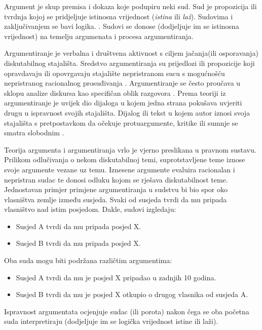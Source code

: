 Argument je skup premisa i dokaza koje podupiru neki sud. Sud je propozicija ili tvrdnja  kojoj se pridjeljuje istinosna vrijednost (\emph{istina} ili \emph{laž}). Sudovima i zaključivanjem se bavi logika. \citep{vukovic2007matematicka}. Sudovi se donose (dodjeljuje im se istinosna vrijednost) na temelju argumenata i procesa argumentiranja.  

Argumentiranje je verbalna i društvena aktivnost s ciljem jačanja(ili osporavanja) diskutabilnog stajališta. Sredstvo argumentiranja su prijedlozi ili propozicije  koji opravdavaju ili opovrgavaju stajalište nepristranom sucu s mogućnošću nepristranog racionalnog prosuđivanja \citep{rahwan2006representing}. Argumentiranje se često proučava u sklopu analize diskursa kao specifičan oblik razgovora \citep{palau2009argumentation}. Prema teoriji iz \citep{van2003systematic} argumentiranje je uvijek dio dijaloga u kojem jedna strana pokušava uvjeriti drugu u ispravnost svojih stajališta. Dijalog ili tekst u kojem autor iznosi svoja stajališta s pretpostavkom da očekuje protuargumente, kritike ili sumnje se smatra slobodnim . 

Teorija argumenta i argumentiranja vrlo je vjerno preslikana u pravnom sustavu. Prilikom odlučivanja o nekom diskutabilnoj temi, suprotstavljene teme iznose svoje argumente vezane uz temu. Iznesene argumente evaluira racionalan i nepristran sudac te donosi odluku kojom se rješava diskutabilnost teme.
Jednostavan primjer primjene argumentiranja u sudstvu bi bio spor oko vlasništva zemlje između susjeda. Svaki od susjeda tvrdi da mu pripada vlasništvo nad istim posjedom. Dakle, sudovi izgledaju:

\begin{itemize}
\item Susjed A tvrdi da mu pripada posjed X.
\item Susjed B tvrdi da mu pripada posjed X.
\end{itemize}

Oba suda mogu biti podržana različtim argumentima:

\begin{itemize}
\item Susjed A tvrdi da mu je posjed X pripadao u zadnjih 10 godina.
\item Susjed B tvrdi da mu je posjed X otkupio o drugog vlasnika od susjeda A.
\end{itemize}

Ispravnost argumentata ocjenjuje sudac (ili porota) nakon čega se oba početna suda interpretiraju (dodjeljuje im se logička vrijednost istine ili laži).  

